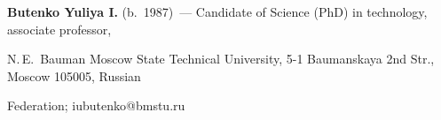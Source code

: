 \vspace*{-12pt} 





\Contrl





\vspace*{-2pt}








\noindent


\textbf{Butenko Yuliya I.} (b.\ 1987)~--- Candidate of Science (PhD) in technology, associate professor, 


N.\,E.~Bauman Moscow State Technical University, 5-1 Baumanskaya 2nd Str., Moscow 105005, Russian 


Federation; \mbox{iubutenko@bmstu.ru}





\label{end\stat}





\renewcommand{\bibname}{\protect\rm Литература} 


